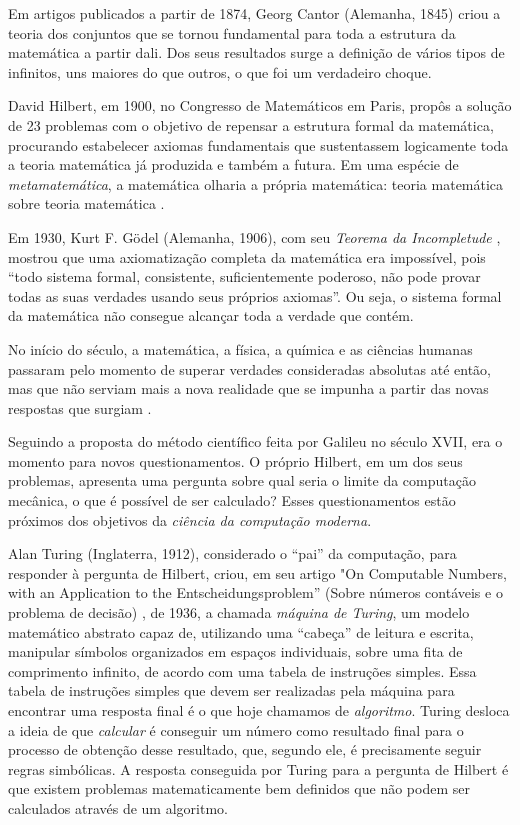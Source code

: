 \documentclass{hipatia}
\begin{document}
Em artigos publicados a partir de 1874, Georg Cantor (Alemanha, 1845) criou a teoria dos conjuntos que se tornou fundamental para toda a estrutura da matemática a partir dali. Dos seus resultados surge a definição de vários tipos de infinitos, uns maiores do que outros, o que foi um verdadeiro choque.

David Hilbert, em 1900, no Congresso de Matemáticos em Paris, propôs a solução de 23 problemas com o objetivo de repensar a estrutura formal da matemática, procurando estabelecer axiomas fundamentais que sustentassem logicamente toda a teoria matemática já produzida e também a futura. Em uma espécie de \textit{metamatemática}, a matemática olharia a própria matemática: teoria matemática sobre teoria matemática \cite{Reid1970}.

Em 1930, Kurt F. Gödel (Alemanha, 1906), com seu \textit{Teorema da Incompletude} \cite{Godel1930}, mostrou que uma axiomatização completa da matemática era impossível, pois ``todo sistema formal, consistente, suficientemente poderoso, não pode provar todas as suas verdades usando seus próprios axiomas''. Ou seja, o sistema formal da matemática não consegue alcançar toda a verdade que contém. 

No início do século, a matemática, a física, a química e as ciências humanas passaram pelo momento de superar verdades consideradas absolutas até então, mas que não serviam mais a nova realidade que se impunha a partir das novas respostas que surgiam \cite{Kuhn2017}.

Seguindo a proposta do método científico feita por Galileu no século XVII, era o momento para novos questionamentos. O próprio Hilbert, em um dos seus problemas, apresenta uma pergunta  sobre qual seria o limite da computação mecânica, o que é possível de ser calculado? Esses questionamentos estão próximos dos objetivos da \textit{ciência da computação moderna}.

Alan Turing (Inglaterra, 1912), considerado o ``pai'' da computação, para responder à pergunta de Hilbert, criou, em seu artigo "On Computable Numbers, with an Application to the Entscheidungsproblem'' (Sobre números contáveis e o problema de decisão) \cite{Turing1936}, de 1936, a chamada \textit{máquina de Turing}, um modelo matemático abstrato capaz de, utilizando uma ``cabeça'' de leitura e escrita, manipular símbolos organizados em espaços individuais, sobre uma fita de comprimento infinito, de acordo com uma tabela de instruções simples. Essa tabela de instruções simples que devem ser realizadas pela máquina para encontrar uma resposta final é o que hoje chamamos de \textit{algoritmo}. Turing desloca a ideia de que \textit{calcular} é conseguir um número como resultado final para o processo de obtenção desse resultado, que, segundo ele, é precisamente seguir regras simbólicas. A resposta conseguida por Turing para a pergunta de Hilbert é que existem problemas matematicamente bem definidos que não podem ser calculados através de um algoritmo. 
\end{document}
